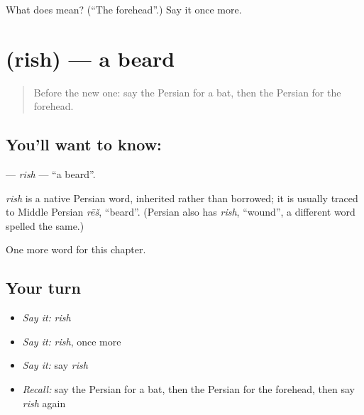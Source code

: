 \begin{tcolorbox}[breakable,colback=teal!4,colframe=teal!35!black,title={Before you move on}]
What does  mean? (\textquotedblleft{}The forehead\textquotedblright{}.) Say it once more.
\end{tcolorbox}
\section[\texorpdfstring{\fa{ریش} (rish)}{ریش (rish)}]{ (rish) — a beard}

\label{lesson:FA-C123-rish}



\begin{quote}
Before the new one: say the Persian for a bat, then the Persian for the forehead.
\end{quote}

\subsection*{You'll want to know: }
\textbf{} — \emph{rish} — \textquotedblleft{}a beard\textquotedblright{}.

\begin{cousinweb}
\emph{rish} is a native Persian word, inherited rather than borrowed; it is usually traced to Middle Persian \emph{rēš}, \textquotedblleft{}beard\textquotedblright{}. (Persian also has \emph{rish}, \textquotedblleft{}wound\textquotedblright{}, a different word spelled the same.)
\end{cousinweb}

\begin{grammarlens}[title={What you've built}]
One more word for this chapter.
\end{grammarlens}

\subsection*{Your turn}
\begin{itemize}
\raggedright
  \item \emph{Say it:} \emph{rish}
  \item \emph{Say it:} \emph{rish}, once more
  \item \emph{Say it:} say \emph{rish}
  \item \emph{Recall:} say the Persian for a bat, then the Persian for the forehead, then say \emph{rish} again
\end{itemize}

